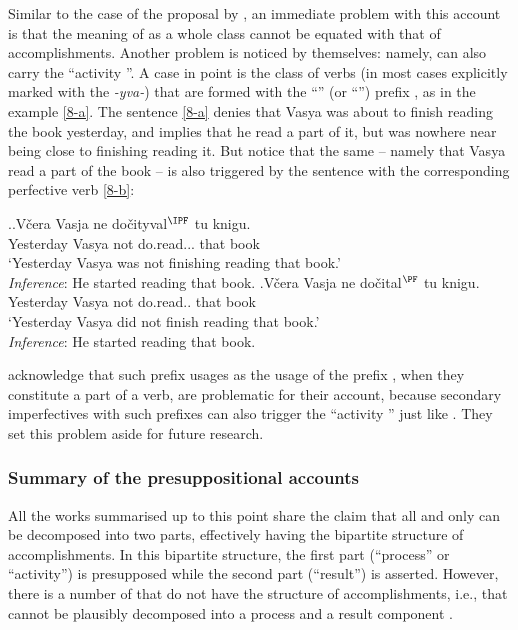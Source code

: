 Similar to the case of the proposal by \citet{Romanova:06}, an immediate problem with this account is that the meaning of  as a whole class cannot be equated with that of accomplishments. Another problem is noticed by \citet{Docekal:09} themselves: namely,  can also carry the ``activity ''. A case in point is the class of  verbs (in most cases explicitly marked with the  \textit{-yva-}) that are formed with the ``'' (or ``'') prefix , as in the example \ref{8-a}. The sentence \ref{8-a} denies that Vasya was about to finish reading the book yesterday, and implies that he read a part of it, but was nowhere near being close to finishing reading it. But notice that the same  -- namely that Vasya read a part of the book -- is also triggered by the sentence with the corresponding perfective verb \ref{8-b}:

\ex.\label{8}\ag.\label{8-a}V\v{c}era Vasja ne do\v{c}ityval$^{\IPF}$ tu knigu.\\
Yesterday Vasya not do.read... that book\\
\trans `Yesterday Vasya was not finishing reading that book.'\\
\textit{Inference}: He started reading that book.
\bg.\label{8-b}V\v{c}era Vasja ne do\v{c}ital$^{\PF}$ tu knigu.\\
Yesterday Vasya not do.read.. that book\\
\trans `Yesterday Vasya did not finish reading that book.'\\
\textit{Inference}: He started reading that book.

\citet{Docekal:09} acknowledge that such prefix usages as the  usage of the prefix , when they constitute a part of a  verb, are problematic for their account, because secondary imperfectives with such prefixes can also trigger the ``activity '' just like . They set this problem aside for future research. 

\subsubsection{Summary of the presuppositional accounts}
All the works summarised up to this point share the claim that all and only  can be decomposed into two parts, effectively having the bipartite structure of accomplishments. In this bipartite structure, the first part (``process'' or ``activity'') is presupposed while the second part (``result'') is asserted. However, there is a number of  that do not have the structure of accomplishments, i.e., that cannot be plausibly decomposed into a process and a result component \citep[see][and references therein]{Filip:00, FilipRothstein:05}. 

